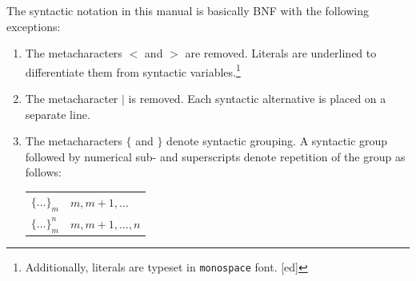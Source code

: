 \documentclass[12pt]{report}
\begin{document}

The syntactic notation in this manual is basically BNF with the
following exceptions:
\begin{enumerate}
\item The metacharacters $<$ and $>$ are removed.  Literals are
  underlined to differentiate them from syntactic
  variables.\footnote{Additionally, literals are typeset in
    \texttt{monospace} font. [ed]}
\item The metacharacter $|$ is removed.  Each syntactic alternative is
  placed on a separate line.
\item The metacharacters $\{$ and $\}$ denote syntactic grouping.  A
  syntactic group followed by numerical sub- and superscripts denote
  repetition of the group as follows:

  \begin{tabular}{ll}
     $\{ \ldots \}_m$ & $m, m+1, \ldots$ \\
     $\{ \ldots \}_m^n$ & $m, m+1, \ldots, n$ \\
  \end{tabular}
\end{enumerate}

\end{document}

